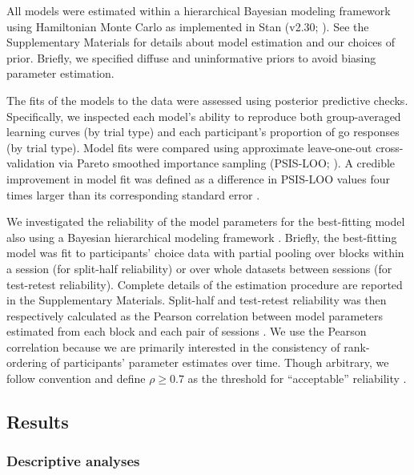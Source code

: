 \documentclass[a4paper,12pt]{article}
\begin{document}
\begin{refsection}[main]
All models were estimated within a hierarchical Bayesian modeling framework using Hamiltonian Monte Carlo as implemented in Stan (v2.30; \cite{carpenter2017stan}). See the Supplementary Materials for details about model estimation and our choices of prior. Briefly, we specified diffuse and uninformative priors to avoid biasing parameter estimation.

The fits of the models to the data were assessed using posterior predictive checks. Specifically, we inspected each model's ability to reproduce both group-averaged learning curves (by trial type) and each participant's proportion of go responses (by trial type). Model fits were compared using approximate leave-one-out cross-validation via Pareto smoothed importance sampling (PSIS-LOO; \cite{vehtari2017practical}). A credible improvement in model fit was defined as a difference in PSIS-LOO values four times larger than its corresponding standard error \cite{Vehtari_undated-tc}.

We investigated the reliability of the model parameters for the best-fitting model also using a Bayesian hierarchical modeling framework \cite{rouder2019psychometrics}. Briefly, the best-fitting model was fit to participants' choice data with partial pooling over blocks within a session (for split-half reliability) or over whole datasets between sessions (for test-retest reliability). Complete details of the estimation procedure are reported in the Supplementary Materials. Split-half and test-retest reliability was then respectively calculated as the Pearson correlation between model parameters estimated from each block and each pair of sessions \cite{brown2020improving, pike2022test}. We use the Pearson correlation because we are primarily interested in the consistency of rank-ordering of participants' parameter estimates over time. Though arbitrary, we follow convention and define $\rho \geq 0.7$ as the threshold for ``acceptable'' reliability \cite{cicchetti1994guidelines}.  

\subsection*{Results}

\subsubsection*{Descriptive analyses}


\end{refsection}
\end{document}
